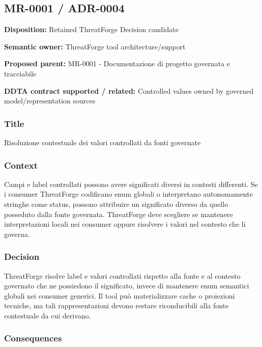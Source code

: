 \documentclass[
  10pt,
  a4paper,
]{article}
\begin{document}
\subsection{MR-0001 / ADR-0004}\label{mr-0001-adr-0004}

\textbf{Disposition:} Retained ThreatForge Decision candidate

\textbf{Semantic owner:} ThreatForge tool architecture/support

\textbf{Proposed parent:} MR-0001 - Documentazione di progetto governata
e tracciabile

\textbf{DDTA contract supported / related:} Controlled values owned by
governed model/representation sources

\subsubsection{Title}\label{title-3}

Risoluzione contestuale dei valori controllati da fonti governate

\subsubsection{Context}\label{context-3}

Campi e label controllati possono avere significati diversi in contesti
differenti. Se i consumer ThreatForge codificano enum globali o
interpretano autonomamente stringhe come status, possono attribuire un
significato diverso da quello posseduto dalla fonte governata.
ThreatForge deve scegliere se mantenere interpretazioni locali nei
consumer oppure risolvere i valori nel contesto che li governa.

\subsubsection{Decision}\label{decision-3}

ThreatForge risolve label e valori controllati rispetto alla fonte e al
contesto governato che ne possiedono il significato, invece di mantenere
enum semantici globali nei consumer generici. Il tool può materializzare
cache o proiezioni tecniche, ma tali rappresentazioni devono restare
riconducibili alla fonte contestuale da cui derivano.

\subsubsection{Consequences}\label{consequences-3}
\end{document}
